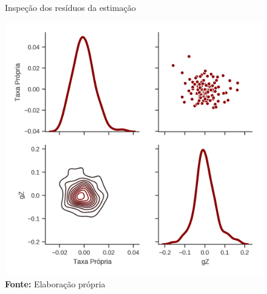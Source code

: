 \begin{figure}[htb]
	\centering
	\caption{Inspeção dos resíduos da estimação}
	\label{residuos}
	\includegraphics[height=.4\textheight]{Fatos_Estilizados/Figs/Residuos_4VECM.png}
	\caption*{\textbf{Fonte:} Elaboração própria}
\end{figure}



